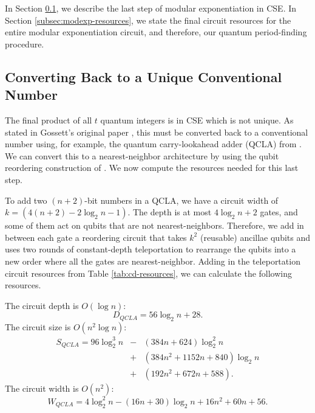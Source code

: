 In Section \ref{subsec:qcla}, we describe the last step of modular
exponentiation in CSE. In Section \ref{subsec:modexp-resources}, we
state the final circuit resources for the entire modular exponentiation
circuit,
and therefore, our quantum period-finding procedure.

\subsection{Converting Back to a Unique Conventional Number}
\label{subsec:qcla}

The final product of all $t$ quantum integers is in CSE which is not
unique. As stated in Gossett's original paper \cite{Gossett1998}, this
must be converted back to a conventional number using, for example, the
quantum carry-lookahead adder (QCLA) from \cite{Draper2004}. We can convert
this to a nearest-neighbor architecture by using the qubit reordering
construction of \cite{Rosenbaum2012}. We now compute the resources
needed for this last step.

To add two $(n+2)$-bit numbers in a QCLA, we have a circuit width of
$k = (4(n+2) - 2\log_2 n - 1)$. The depth is at most $4\log_2 n +2$ gates,
and some of them act on qubits that are not nearest-neighbors. Therefore,
we add in between each gate a reordering circuit that takes $k^2$
(reusable) ancillae
qubits and uses two rounds of constant-depth teleportation to rearrange
the qubits into a new order where all the gates are nearest-neighbor.
Adding in the teleportation circuit resources from Table \ref{tab:cd-resources},
we can calculate the following resources.

The circuit depth is $O(\log n)$:
%
\begin{equation}
D_{QCLA} = 56\log_2 n + 28\text{.}
\end{equation}
%
The circuit size is $O(n^2 \log n)$:
%
\begin{eqnarray}
S_{QCLA} = 96 \log_2^3 n & - & (384n + 624)\log_2^2 n \nonumber \\
              & + & (384n^2 + 1152n + 840) \log_2 n \nonumber \\
              & + & (192n^2 + 672n + 588)\text{.}
\end{eqnarray}
%
The circuit width is $O(n^2)$:
%
\begin{equation}
W_{QCLA} = 4 \log_2^2 n - (16n + 30)\log_2 n + 16n^2 + 60n + 56\text{.}
\end{equation}


